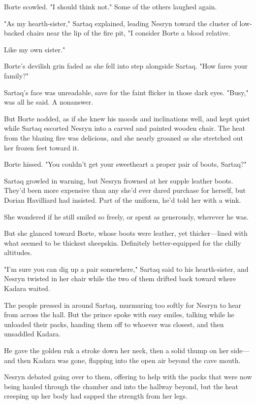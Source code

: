 Borte scowled.
"I should think not."
Some of the others laughed again.

"As my hearth-sister," Sartaq explained, leading Nesryn toward the cluster of low-backed chairs near the lip of the fire pit, "I consider Borte a blood relative.

Like my own sister."

Borte's devilish grin faded as she fell into step alongside Sartaq.
"How fares your family?"

Sartaq's face was unreadable, save for the faint flicker in those dark eyes.
"Busy," was all he said.
A nonanswer.

But Borte nodded, as if she knew his moods and inclinations well, and kept quiet while Sartaq escorted Nesryn into a carved and painted wooden chair.
The heat from the blazing fire was delicious, and she nearly groaned as she stretched out her frozen feet toward it.

Borte hissed.
"You couldn't get your sweetheart a proper pair of boots, Sartaq?"

Sartaq growled in warning, but Nesryn frowned at her supple leather boots.
They'd been more expensive than any she'd ever dared purchase for herself, but Dorian Havilliard had insisted.
Part of the uniform, he'd told her with a wink.

She wondered if he still smiled so freely, or spent as generously, wherever he was.

But she glanced toward Borte, whose boots were leather, yet thicker---lined with what seemed to be thickest sheepskin.
Definitely better-equipped for the chilly altitudes.

"I'm sure you can dig up a pair somewhere," Sartaq said to his hearth-sister, and Nesryn twisted in her chair while the two of them drifted back toward where Kadara waited.

The people pressed in around Sartaq, murmuring too softly for Nesryn to hear from across the hall.
But the prince spoke with easy smiles, talking while he unloaded their packs, handing them off to whoever was closest, and then unsaddled Kadara.

He gave the golden ruk a stroke down her neck, then a solid thump on her side---and then Kadara was gone, flapping into the open air beyond the cave mouth.

Nesryn debated going over to them, offering to help with the packs that were now being hauled through the chamber and into the hallway beyond, but the heat creeping up her body had sapped the strength from her legs.


